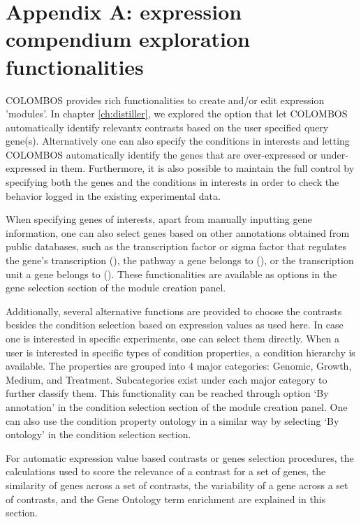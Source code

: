 \chapter{Appendix A: expression compendium exploration 
functionalities}\label{ch:apd-colombos}

\instructionsappendices

COLOMBOS provides rich functionalities to create and/or edit
expression 'modules'. In chapter \ref{ch:distiller}, we explored the
option that let COLOMBOS automatically identify relevantx contrasts
based on the user specified query gene(s).
%
Alternatively one can also specify the conditions in interests and
letting COLOMBOS automatically identify the genes that are
over-expressed or under-expressed in them.  Furthermore, it is also
possible to maintain the full control by specifying both the genes and
the conditions in interests in order to check the behavior logged in
the existing experimental data.

When specifying genes of interests, apart from manually inputting gene
information, one can also select genes based on other annotations
obtained from public databases, such as the transcription factor or
sigma factor that regulates the gene’s transcription
(\cite{Gama-Castro2008}), the pathway a gene belongs to
(\cite{Karp2005}), or the transcription unit a gene belongs to
(\cite{Karp2005}).  These functionalities are available as options in
the gene selection section of the module creation panel.

Additionally, several alternative functions are provided to choose the
contrasts besides the condition selection based on expression values
as used here. In case one is interested in specific experiments, one
can select them directly. When a user is interested in specific types
of condition properties, a condition hierarchy is available. The
properties are grouped into 4 major categories: Genomic, Growth,
Medium, and Treatment.  Subcategories exist under each major category
to further classify them.  This functionality can be reached through
option `By annotation' in the condition selection section of the
module creation panel.  One can also use the condition property
ontology in a similar way by selecting `By ontology' in the condition
selection section.

For automatic expression value based contrasts or genes selection
procedures, the calculations used to score the relevance of a contrast
for a set of genes, the similarity of genes across a set of contrasts,
the variability of a gene across a set of contrasts, and the Gene
Ontology term enrichment are explained in this section.


